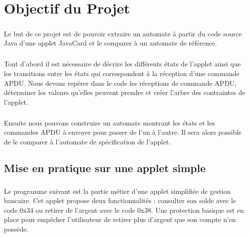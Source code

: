 \chapter{Objectif du Projet}
\paragraph{}
Le but de ce projet est de pouvoir extraire un automate à partir du code source Java d’une applet JavaCard et le comparer à un automate de référence.

\paragraph{}
Tout d’abord il est nécessaire de décrire les différents états de l’applet ainsi que les transitions entre les états qui correspondent à la réception d’une commande APDU. Nous devons repérer dans le code les réceptions de commande APDU, déterminer les valeurs qu’elles peuvent prendre et créer l’arbre des contraintes de l’applet.
\paragraph{}
Ensuite nous pouvons construire un automate montrant les états et les commandes APDU à envoyer pour passer de l’un à l’autre. Il sera alors possible de le comparer à l’automate de spécification de l’applet.

\section{Mise en pratique sur une applet simple}

\paragraph{}
Le programme suivant est la partie métier d’une applet simplifiée de gestion bancaire. Cet applet propose deux fonctionnalités : consulter son solde avec le code 0x34 ou retirer de l’argent avec le code 0x38. Une protection basique est en place pour empêcher l’utilisateur de retirer plus d’argent que son compte n’en possède.


